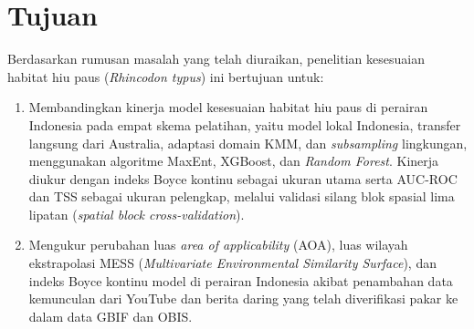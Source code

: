 \section{Tujuan}

Berdasarkan rumusan masalah yang telah diuraikan, penelitian kesesuaian habitat
hiu paus (\textit{Rhincodon typus}) ini bertujuan untuk:

\begin{enumerate}
    \item Membandingkan kinerja model kesesuaian habitat hiu paus di perairan
    Indonesia pada empat skema pelatihan, yaitu model lokal Indonesia, transfer
    langsung dari Australia, adaptasi domain KMM, dan \textit{subsampling}
    lingkungan, menggunakan algoritme MaxEnt, XGBoost, dan \textit{Random
    Forest}. Kinerja diukur dengan indeks Boyce kontinu sebagai ukuran utama
    serta AUC-ROC dan TSS sebagai ukuran pelengkap, melalui validasi silang
    blok spasial lima lipatan (\textit{spatial block cross-validation}).
    \item Mengukur perubahan luas \textit{area of applicability} (AOA), luas
    wilayah ekstrapolasi MESS (\textit{Multivariate Environmental Similarity
    Surface}), dan indeks Boyce kontinu model di perairan Indonesia akibat
    penambahan data kemunculan dari YouTube dan berita daring yang telah
    diverifikasi pakar ke dalam data GBIF dan OBIS.
\end{enumerate}

